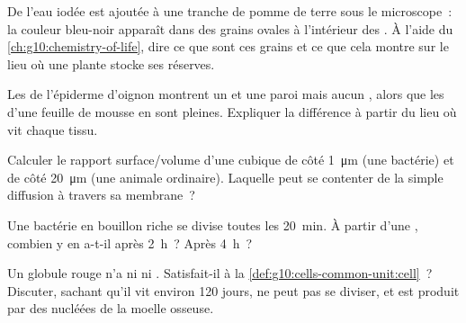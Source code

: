 \begin{exercise}[$\star\star$]\label{exo:g10:cells-common-unit:8}
De l'eau iodée est ajoutée à une tranche de pomme de terre sous le
microscope~: la couleur bleu-noir apparaît dans des grains ovales à
l'intérieur des . À l'aide du
\cref{ch:g10:chemistry-of-life}, dire ce que sont ces grains et ce que
cela montre sur le lieu où une plante stocke ses réserves.
\end{exercise}

\begin{exercise}[$\star\star$]\label{exo:g10:cells-common-unit:9}
Les  de l'épiderme d'oignon montrent un  et une paroi mais
aucun , alors que les  d'une feuille de mousse en
sont pleines. Expliquer la différence à partir du lieu où vit chaque
tissu.
\end{exercise}

\begin{exercise}[$\star\star$]\label{exo:g10:cells-common-unit:10}
Calculer le rapport surface/volume d'une  cubique de côté
\qty{1}{\micro m} (une bactérie) et de côté \qty{20}{\micro m} (une
 animale ordinaire). Laquelle peut se contenter de la simple
diffusion à travers sa membrane~?
\end{exercise}

\begin{exercise}[$\star\star$]\label{exo:g10:cells-common-unit:11}
Une bactérie en bouillon riche se divise toutes les \qty{20}{min}. À
partir d'une , combien y en a-t-il après \qty{2}{h}~? Après
\qty{4}{h}~?
\end{exercise}

\begin{exercise}[$\star\star\star$]\label{exo:g10:cells-common-unit:12}
Un globule rouge n'a ni  ni . Satisfait-il à la
\cref{def:g10:cells-common-unit:cell}~? Discuter, sachant qu'il vit
environ 120 jours, ne peut pas se diviser, et est produit par des
 nucléées de la moelle osseuse.
\end{exercise}

